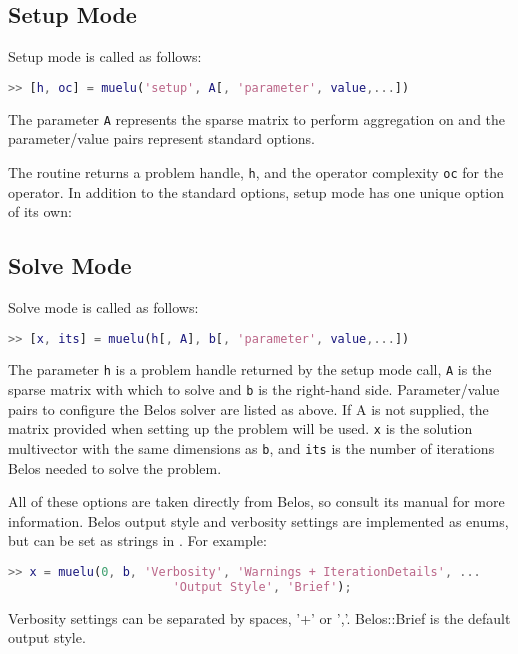\subsection{Setup Mode}
Setup mode is called as follows:
\begin{lstlisting}[language=Matlab]
  >> [h, oc] = muelu('setup', A[, 'parameter', value,...])
\end{lstlisting}
The parameter \texttt{A} represents the sparse matrix to perform aggregation on
and the parameter/value pairs represent standard \muelu options.

The routine returns a problem handle, \texttt{h}, and the operator
complexity \texttt{oc} for the operator.  In addition to the standard
options, setup mode has one unique option of its own:


\subsection{Solve Mode}
Solve mode is called as follows:
\begin{lstlisting}[language=Matlab]
  >> [x, its] = muelu(h[, A], b[, 'parameter', value,...])
\end{lstlisting}
The parameter \texttt{h} is a problem handle returned by the
setup mode call, \texttt{A} is the sparse matrix with which to
solve and \texttt{b} is the right-hand side.  Parameter/value pairs
to configure the Belos solver are listed as above. If A is not supplied,
the matrix provided when setting up the problem will be used. \texttt{x} is
the solution multivector with the same dimensions as \texttt{b}, and \texttt{its}
is the number of iterations Belos needed to solve the problem.

All of these options are taken directly from Belos, so consult its
manual for more information. Belos output style and verbosity settings
are implemented as enums, but can be set as strings in \muemex. For example:

\begin{lstlisting}[language=Matlab]
  >> x = muelu(0, b, 'Verbosity', 'Warnings + IterationDetails', ...
                       'Output Style', 'Brief');
\end{lstlisting}

Verbosity settings can be separated by spaces, '+' or ','. Belos::Brief
is the default output style.

